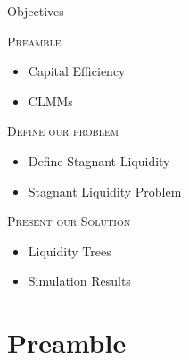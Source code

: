 \documentclass[10pt,xcolor=svgnames]{beamer} %
\begin{document}
\begin{frame}{Objectives}


\begin{exampleblock}{\textsc{Preamble}}
\begin{itemize}
  \item Capital Efficiency
  \item CLMMs
\end{itemize}  
\end{exampleblock}

\begin{exampleblock}{\textsc{Define our problem}}
\begin{itemize}
  \item Define Stagnant Liquidity
  \item Stagnant Liquidity Problem
\end{itemize}  
\end{exampleblock}

\begin{exampleblock}{\textsc{Present our Solution}}
\begin{itemize}
  \item Liquidity Trees
  \item Simulation Results
\end{itemize}
\end{exampleblock}

\end{frame}


\section{Preamble}
\end{document}
